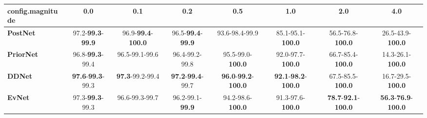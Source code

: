 \begin{tabular}{lccccccc}
\toprule
\textbf{config.magnitude} &                               0.0 &                                0.1 &                               0.2 &                                         0.5 &                                         1.0 &                                         2.0 &                                         4.0 \\
\midrule
\textbf{PostNet } &  97.2-\textbf{99.3}-\textbf{99.9} &  96.9-\textbf{99.4}-\textbf{100.0} &  96.5-\textbf{99.4}-\textbf{99.9} &                              93.6-98.4-99.9 &                    85.1-95.1-\textbf{100.0} &                    56.5-76.8-\textbf{100.0} &                    26.5-43.9-\textbf{100.0} \\
\textbf{PriorNet} &           96.8-\textbf{99.3}-99.4 &                     96.5-99.1-99.6 &                    96.4-99.2-99.8 &                    95.5-99.0-\textbf{100.0} &                    92.0-97.7-\textbf{100.0} &                    66.7-85.4-\textbf{100.0} &                    14.3-26.1-\textbf{100.0} \\
\textbf{DDNet   } &  \textbf{97.6}-\textbf{99.3}-99.3 &            \textbf{97.3}-99.2-99.4 &  \textbf{97.2}-\textbf{99.4}-99.7 &  \textbf{96.0}-\textbf{99.2}-\textbf{100.0} &  \textbf{92.1}-\textbf{98.2}-\textbf{100.0} &                    67.5-85.5-\textbf{100.0} &                    16.7-29.5-\textbf{100.0} \\
\textbf{EvNet   } &           97.3-\textbf{99.3}-99.3 &                     96.6-99.3-99.7 &           96.2-99.1-\textbf{99.9} &                    94.2-98.6-\textbf{100.0} &                    91.3-97.6-\textbf{100.0} &  \textbf{78.7}-\textbf{92.1}-\textbf{100.0} &  \textbf{56.3}-\textbf{76.9}-\textbf{100.0} \\
\bottomrule
\end{tabular}
